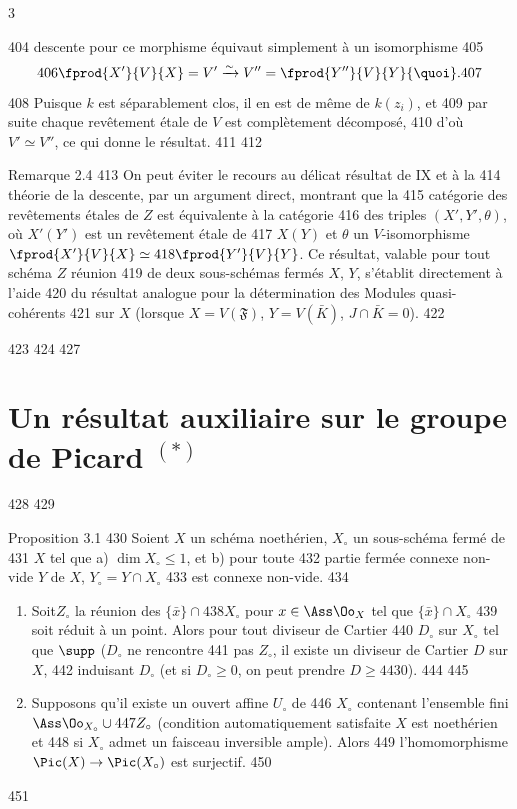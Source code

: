 3	\documentclass[10pt]{../fichiers-configuration-latex/smfart}
\begin{document}
   404	descente pour ce morphisme équivaut simplement à un isomorphisme
   405	$$
   406	\fprod{X'}{V}{X}=V'\xrightarrow{\sim} V''=\fprod{Y''}{V}{Y}{\quoi}.
   407	$$
   408	Puisque $k$ est séparablement clos, il en est de même de $k(z_i)$, et
   409	par suite chaque revêtement étale de $V$ est complètement décomposé,
   410	d'où $V'\simeq V''$, ce qui donne le résultat.
   411	
   412	\begin{enonce*}[remark]{Remarque 2.4}
   413	On peut éviter le recours au délicat résultat de \SGA IX et à la
   414	théorie de la descente, par un argument direct, montrant que la
   415	catégorie des revêtements étales de $Z$ est équivalente à la catégorie
   416	des triples $(X',Y',\theta)$, où $X'(Y')$ est un revêtement étale de
   417	$X(Y)$ et $\theta$ un $V$-isomorphisme $\fprod{X'}{V}{X}\simeq
   418	\fprod{Y'}{V}{Y}$. Ce résultat, valable pour tout schéma $Z$ réunion
   419	de deux sous-schémas fermés $X$, $Y$, s'établit directement à l'aide
   420	du résultat analogue pour la détermination des Modules quasi-cohérents
   421	sur $X$ (lorsque $X=V(\mathfrak{F})$, $Y=V(\bar{K})$, $J\cap \bar{K}=0$).
   422	\end{enonce*}
   423	
   424	
   427	\section{Un résultat auxiliaire sur le groupe de Picard ${}^{(*)}$}
   428	
   429	\begin{enonce*}{Proposition 3.1}
   430	Soient $X$ un schéma noethérien, $X_{\circ}$ un sous-schéma fermé de
   431	$X$ tel que {\rm a)} $\dim X_{\circ}\leq 1$, et {\rm b)} pour toute
   432	partie fermée connexe non-vide $Y$ de $X$, $Y_{\circ}=Y\cap X_{\circ}$
   433	est connexe non-vide.
   434	\begin{enumerate}
   435	\renewcommand{\theenumi}{\roman{enumi}}
   436	\renewcommand{\labelenumi}{(\theenumi)}
   437	\item Soit\pageoriginale $Z_{\circ}$ la réunion des $\{\bar{x}\}\cap
   438	X_{\circ}$ pour $x\in \Ass \Oo_X$ tel que $\{\bar{x}\}\cap X_{\circ}$
   439	soit réduit à un point. Alors pour tout diviseur de Cartier
   440	$D_{\circ}$ sur $X_{\circ}$ tel que $\supp$ ($D_{\circ}$ ne rencontre
   441	pas $Z_{\circ}$, il existe un diviseur de Cartier $D$ sur $X$,
   442	induisant $D_{\circ}$ (et si $D_{\circ}\geq 0$, on peut prendre $D\geq
   443	0$).
   444	
   445	\item Supposons qu'il existe un ouvert affine $U_{\circ}$ de
   446	$X_{\circ}$ contenant l'ensemble fini $\Ass \Oo_{X_{\circ}}\cup
   447	Z_{\circ}$ (condition automatiquement satisfaite $X$ est noethérien et
   448	si $X_{\circ}$ admet un faisceau inversible ample). Alors
   449	l'homomorphisme $\Pic(X)\rightarrow \Pic(X_{\circ})$ est surjectif.
   450	\end{enumerate}
   451	\end{enonce*}
\end{document}

